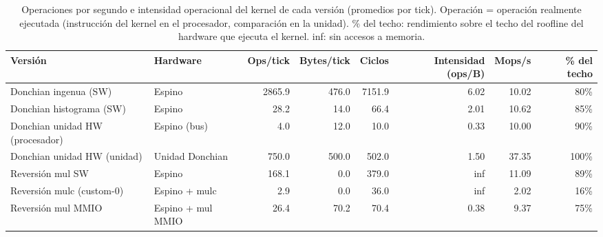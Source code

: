 \begin{table}[htbp]
\centering
\small
\begin{adjustbox}{max width=\linewidth}
\begin{tabular}{llrrrrrr}
\toprule
Versión & Hardware & Ops/tick & Bytes/tick & Ciclos & Intensidad (ops/B) & Mops/s & \% del techo \\
\midrule
Donchian ingenua (SW) & Espino & 2865.9 & 476.0 & 7151.9 & 6.02 & 10.02 & 80\% \\
Donchian histograma (SW) & Espino & 28.2 & 14.0 & 66.4 & 2.01 & 10.62 & 85\% \\
Donchian unidad HW (procesador) & Espino (bus) & 4.0 & 12.0 & 10.0 & 0.33 & 10.00 & 90\% \\
Donchian unidad HW (unidad) & Unidad Donchian & 750.0 & 500.0 & 502.0 & 1.50 & 37.35 & 100\% \\
Reversión mul SW & Espino & 168.1 & 0.0 & 379.0 & inf & 11.09 & 89\% \\
Reversión mulc (custom-0) & Espino + mulc & 2.9 & 0.0 & 36.0 & inf & 2.02 & 16\% \\
Reversión mul MMIO & Espino + mul MMIO & 26.4 & 70.2 & 70.4 & 0.38 & 9.37 & 75\% \\
\bottomrule
\end{tabular}
\end{adjustbox}
\caption{Operaciones por segundo e intensidad operacional del kernel de cada versión (promedios por tick). Operación = operación realmente ejecutada (instrucción del kernel en el procesador, comparación en la unidad). \% del techo: rendimiento sobre el techo del roofline del hardware que ejecuta el kernel. inf: sin accesos a memoria.}
\end{table}
